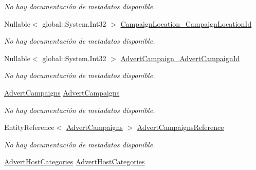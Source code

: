 \begin{DoxyCompactItemize}
\begin{DoxyCompactList}\small\item\em No hay documentación de metadatos disponible. \end{DoxyCompactList}\item 
Nullable$<$ global\-::\-System.\-Int32 $>$ \hyperlink{class_game_memory_1_1_advert_hosts_afa83e1eed2d680e2b5025fc5a79562dc}{Campaign\-Location\-\_\-\-Campaign\-Location\-Id}
\begin{DoxyCompactList}\small\item\em No hay documentación de metadatos disponible. \end{DoxyCompactList}\item 
Nullable$<$ global\-::\-System.\-Int32 $>$ \hyperlink{class_game_memory_1_1_advert_hosts_af853b0ead0e1a677765d61f294615155}{Advert\-Campaign\-\_\-\-Advert\-Campaign\-Id}
\begin{DoxyCompactList}\small\item\em No hay documentación de metadatos disponible. \end{DoxyCompactList}\item 
\hyperlink{class_game_memory_1_1_advert_campaigns}{Advert\-Campaigns} \hyperlink{class_game_memory_1_1_advert_hosts_a156a61056fa542946f9e4f130cef3a0c}{Advert\-Campaigns}
\begin{DoxyCompactList}\small\item\em No hay documentación de metadatos disponible. \end{DoxyCompactList}\item 
Entity\-Reference$<$ \hyperlink{class_game_memory_1_1_advert_campaigns}{Advert\-Campaigns} $>$ \hyperlink{class_game_memory_1_1_advert_hosts_ac1362cf9f56041ecda1da4beee7cd9b2}{Advert\-Campaigns\-Reference}
\begin{DoxyCompactList}\small\item\em No hay documentación de metadatos disponible. \end{DoxyCompactList}\item 
\hyperlink{class_game_memory_1_1_advert_host_categories}{Advert\-Host\-Categories} \hyperlink{class_game_memory_1_1_advert_hosts_ac76d2a1c64a2108e2caeb0ba0ec783eb}{Advert\-Host\-Categories}

\end{DoxyCompactItemize}

